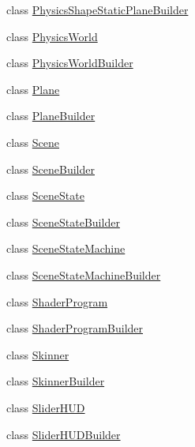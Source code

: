 \begin{DoxyCompactItemize}
\item 
class \mbox{\hyperlink{classnjli_1_1_world_factory_a04aa4ba3952aae7bb7bd4c31ad24a705}{Physics\+Shape\+Static\+Plane\+Builder}}
\item 
class \mbox{\hyperlink{classnjli_1_1_world_factory_abd7959b8cbcd7c25bc6c0c8b1ea26ce6}{Physics\+World}}
\item 
class \mbox{\hyperlink{classnjli_1_1_world_factory_ab5ea5e632e260cb2f092d2423645bc82}{Physics\+World\+Builder}}
\item 
class \mbox{\hyperlink{classnjli_1_1_world_factory_a89c71bac3ec153ca700e1cd69900b6ce}{Plane}}
\item 
class \mbox{\hyperlink{classnjli_1_1_world_factory_abcb05c23b1eab15866956ae243491395}{Plane\+Builder}}
\item 
class \mbox{\hyperlink{classnjli_1_1_world_factory_a032858ae1fe02d2d1170981c2af2d67c}{Scene}}
\item 
class \mbox{\hyperlink{classnjli_1_1_world_factory_af744eb288828f7c98d57adeb8603027a}{Scene\+Builder}}
\item 
class \mbox{\hyperlink{classnjli_1_1_world_factory_ace13a6b81a7cce08dd6f9d0c1c00af04}{Scene\+State}}
\item 
class \mbox{\hyperlink{classnjli_1_1_world_factory_ab8cb8ab88a21ac3720ea996ba7e6aa9b}{Scene\+State\+Builder}}
\item 
class \mbox{\hyperlink{classnjli_1_1_world_factory_a0554623d5c61159d79d55a1d5a0f3c25}{Scene\+State\+Machine}}
\item 
class \mbox{\hyperlink{classnjli_1_1_world_factory_a4d92e8ea8141a3032ed9fcc2a7451218}{Scene\+State\+Machine\+Builder}}
\item 
class \mbox{\hyperlink{classnjli_1_1_world_factory_aef20119bde6aff11ffd23f3ea2131b86}{Shader\+Program}}
\item 
class \mbox{\hyperlink{classnjli_1_1_world_factory_a95d0213badfc8214cbfd42122b313cef}{Shader\+Program\+Builder}}
\item 
class \mbox{\hyperlink{classnjli_1_1_world_factory_a7d2180162b18e72eaec14e87269710da}{Skinner}}
\item 
class \mbox{\hyperlink{classnjli_1_1_world_factory_a389430808fadd843bcbe0e688a805990}{Skinner\+Builder}}
\item 
class \mbox{\hyperlink{classnjli_1_1_world_factory_a601e2cab15ade2e7f8e72cd6b68c3b1f}{Slider\+H\+UD}}
\item 
class \mbox{\hyperlink{classnjli_1_1_world_factory_abf1112100157e104cac60cd5134cb52f}{Slider\+H\+U\+D\+Builder}}

\end{DoxyCompactItemize}

